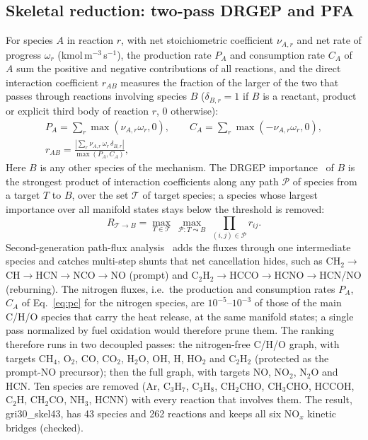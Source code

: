 \documentclass[preprint,review,12pt]{elsarticle}
\newcommand{\ce}[1]{\ensuremath{\mathrm{#1}}}
\begin{document}
\subsection{Skeletal reduction: two-pass DRGEP and PFA}
For species $A$ in reaction $r$, with net stoichiometric coefficient $\nu_{A,r}$ and net rate of progress $\omega_r$
(kmol\,m$^{-3}$\,s$^{-1}$), the production rate $P_A$ and consumption rate $C_A$ of $A$ sum the positive and negative
contributions of all reactions, and the direct interaction coefficient $r_{AB}$ measures the fraction of the larger of
the two that passes through reactions involving species $B$ ($\delta_{B,r}=1$ if $B$ is a reactant, product or
explicit third body of reaction $r$, 0 otherwise):
\begin{gather}
P_A=\sum_r \max(\nu_{A,r}\omega_r,0),\qquad C_A=\sum_r \max(-\nu_{A,r}\omega_r,0),\label{eq:pc}\\
r_{AB}=\frac{\left|\sum_r \nu_{A,r}\,\omega_r\,\delta_{B,r}\right|}{\max(P_A,C_A)},
\end{gather}
Here $B$ is any other species of the mechanism. The DRGEP importance~\cite{pepiot2008drgep} of $B$ is the
strongest product of interaction coefficients along any path $\mathcal{P}$ of species from a target $T$ to $B$, over
the set $\mathcal{T}$ of target species; a species whose largest importance over all manifold states stays below the
threshold is removed:
\begin{equation}
R_{\mathcal{T}\to B}=\max_{T\in\mathcal{T}}\ \max_{\mathcal{P}:T\leadsto B}\ \prod_{(i,j)\in\mathcal{P}} r_{ij}.
\end{equation}
Second-generation path-flux analysis~\cite{sun2010pfa} adds the fluxes through one intermediate species and catches
multi-step shunts that net cancellation hides, such as \ce{CH_{2}}$\to$\allowbreak CH$\to$\allowbreak HCN$\to$\allowbreak NCO$\to$\allowbreak NO (prompt) and
\ce{C_{2}H_{2}}$\to$\allowbreak HCCO$\to$\allowbreak HCNO$\to$\allowbreak HCN/NO (reburning). The nitrogen fluxes, i.e.\ the production and consumption rates $P_A$, $C_A$ of
Eq.~\eqref{eq:pc} for the nitrogen species, are $10^{-5}$--$10^{-3}$ of those of the main C/H/O species that carry the heat
release, at the same manifold states; a single pass normalized by fuel oxidation would therefore prune them. The ranking therefore runs in
two decoupled passes: the nitrogen-free C/H/O graph, with targets \ce{CH_{4}}, \ce{O_{2}}, CO, \ce{CO_{2}}, \ce{H_{2}O}, OH, H,
\ce{HO_{2}} and \ce{C_{2}H_{2}} (protected as the prompt-NO precursor); then the full graph, with targets NO, \ce{NO_{2}},
\ce{N_{2}O} and HCN. Ten species are removed (Ar, \ce{C_{3}H_{7}}, \ce{C_{3}H_{8}}, \ce{CH_{2}CHO}, \ce{CH_{3}CHO}, HCCOH, \ce{C_{2}H},
\ce{CH_{2}CO}, \ce{NH_{3}}, HCNN) with every reaction that involves them. The result, gri30\_skel43, has 43 species and 262
reactions and keeps all six NO$_x$ kinetic bridges (checked).
\end{document}
